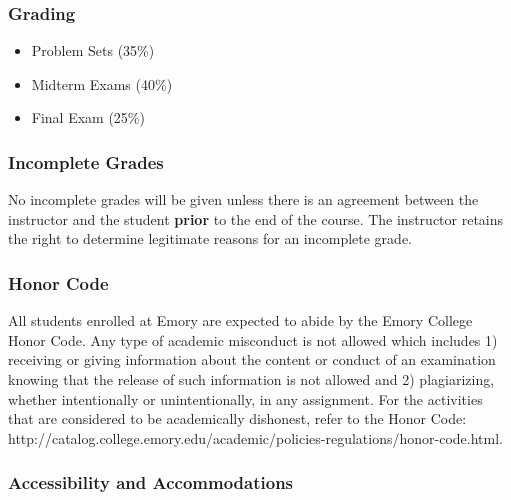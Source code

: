 \documentclass[12pt]{article}
\begin{document}
		
	\subsubsection*{Grading }		
	
			\begin{itemize}
			\item Problem Sets (35\%)
			\item Midterm Exams (40\%)
			\item Final Exam (25\%)
			\end{itemize}
			
			\subsubsection*{Incomplete Grades}
			No incomplete grades will be given unless there is an agreement between the instructor and the student {\bf prior} to the end of the course.  The instructor retains the right to determine legitimate reasons for an incomplete grade.
			
\subsubsection*{Honor Code}

All students enrolled at Emory are expected to abide by the Emory College Honor Code. Any type of academic misconduct is not allowed which includes 1) receiving or giving information about the content or conduct of an examination knowing that the release of such information is not allowed and 2) plagiarizing, whether intentionally or unintentionally, in any assignment. For the activities that are considered to be academically dishonest, refer to the Honor Code: http://catalog.college.emory.edu/academic/policies-regulations/honor-code.html.\\

\subsubsection*{Accessibility and Accommodations}
\end{document}
